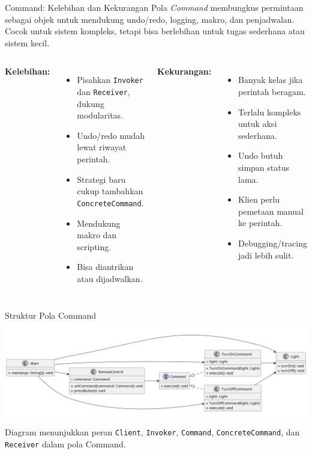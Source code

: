 \documentclass[aspectratio=169, table]{beamer}
\begin{document}
\begin{frame}{Command: Kelebihan dan Kekurangan}
	\vspace{10pt}
	Pola \textit{Command} membungkus permintaan sebagai objek untuk mendukung undo/redo, logging, makro, dan penjadwalan. Cocok untuk sistem kompleks, tetapi bisa berlebihan untuk tugas sederhana atau sistem kecil.
	
	\vspace{6pt}
	\begin{columns}[T]
		\textbf{Kelebihan:}
		\begin{itemize}
			\item Pisahkan \texttt{Invoker} dan \texttt{Receiver}, dukung modularitas.
			\item Undo/redo mudah lewat riwayat perintah.
			\item Strategi baru cukup tambahkan \texttt{ConcreteCommand}.
			\item Mendukung makro dan scripting.
			\item Bisa diantrikan atau dijadwalkan.
		\end{itemize}
		
		\textbf{Kekurangan:}
		\begin{itemize}
			\item Banyak kelas jika perintah beragam.
			\item Terlalu kompleks untuk aksi sederhana.
			\item Undo butuh simpan status lama.
			\item Klien perlu pemetaan manual ke perintah.
			\item Debugging/tracing jadi lebih sulit.
		\end{itemize}
	\end{columns}
\end{frame}

\begin{frame}{Struktur Pola Command}
	\vspace{10pt}
	\centering
	\includegraphics[width=\textwidth]{../../figures/out/command.png}
	
	\vspace{6pt}
	\small Diagram menunjukkan peran \texttt{Client}, \texttt{Invoker}, \texttt{Command}, \texttt{ConcreteCommand}, dan \texttt{Receiver} dalam pola Command.
\end{frame}
\end{document}

